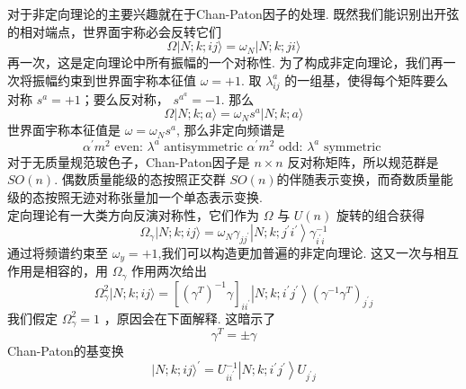 对于非定向理论的主要兴趣就在于Chan-Paton因子的处理. 既然我们能识别出开弦的相对端点，世界面宇称必会反转它们
\begin{equation}
	\Omega|N ; k ; i j\rangle=\omega_{N}|N ; k ; j i\rangle
\end{equation}
再一次，这是定向理论中所有振幅的一个对称性. 为了构成非定向理论，我们再一次将振幅约束到世界面宇称本征值 $\omega=+1 $. 取 $\lambda_{i j}^{a}$ 的一组基，使得每个矩阵要么对称 $s^{a}=+1$；要么反对称， $s^{a^{a}}=-1$. 那么
\begin{equation}
	\Omega|N ; k ; a\rangle=\omega_{N} s^{a}|N ; k ; a\rangle
\end{equation}
世界面宇称本征值是 $\omega=\omega_{N} s^{a}$, 那么非定向频谱是
\begin{subequations}
\begin{equation}
\alpha^{\prime} m^{2} \text { even: }  \lambda^{a} \text { antisymmetric } 	
\end{equation}
\begin{equation}
\alpha^{\prime} m^{2} \text { odd: }  \lambda^{a} \text { symmetric }
\end{equation}			
\end{subequations}
对于无质量规范玻色子，Chan-Paton因子是 $n \times n$ 反对称矩阵，所以规范群是 $S O(n) $.  偶数质量能级的态按照正交群 $S O(n)$的伴随表示变换，而奇数质量能级的态按照无迹对称张量加一个单态表示变换.\\
定向理论有一大类方向反演对称性，它们作为 $\Omega$ 与 $U(n)$ 旋转的组合获得
\begin{equation}
	\Omega_{\gamma}|N ; k ; i j\rangle=\omega_{N} \gamma_{j j^{\prime}}\left|N ; k ; j^{\prime} i^{\prime}\right\rangle \gamma_{i^{\prime} i}^{-1}
\end{equation}
通过将频谱约束至 $\omega_{y}=+1$,我们可以构造更加普遍的非定向理论. 这又一次与相互作用是相容的，用 $\Omega_{\gamma}$ 作用两次给出
\begin{equation}
	\Omega_{\gamma}^{2}|N ; k ; i j\rangle=\left[\left(\gamma^{T}\right)^{-1} \gamma\right]_{i i^{\prime}}\left|N ; k ; i^{\prime} j^{\prime}\right\rangle\left(\gamma^{-1} \gamma^{T}\right)_{j^{\prime} j}
\end{equation}
我们假定 $\Omega_{\gamma}^{2}=1$ ，原因会在下面解释. 这暗示了
\begin{equation}
	\gamma^{T}=\pm \gamma
\end{equation}
Chan-Paton的基变换
\begin{equation}
	|N ; k ; i j\rangle^{\prime}=U_{i i^{\prime}}^{-1}\left|N ; k ; i^{\prime} j^{\prime}\right\rangle U_{j^{\prime} j}
\end{equation}
